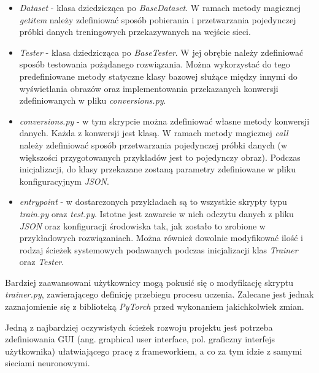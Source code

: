   \begin{itemize}
  \item \textit{Dataset} - klasa dziedzicząca po \textit{BaseDataset}. W ramach
  metody magicznej \textit{getitem} należy zdefiniować sposób pobierania i przetwarzania
  pojedynczej próbki danych treningowych przekazywanych na wejście sieci.

  \item \textit{Tester} - klasa dziedzicząca po \textit{BaseTester}. W jej obrębie
  należy zdefiniować sposób testowania pożądanego rozwiązania. Można wykorzystać
  do tego predefiniowane metody statyczne klasy bazowej służące między innymi
  do wyświetlania obrazów oraz implementowania przekazanych konwersji zdefiniowanych
  w pliku \textit{conversions.py}.

  \item \textit{conversions.py} - w tym skrypcie można zdefiniować własne metody
  konwersji danych. Każda z konwersji jest klasą. W ramach metody magicznej \textit{call}
  należy zdefiniować sposób przetwarzania pojedynczej próbki danych (w większości
  przygotowanych przykładów jest to pojedynczy obraz). Podczas inicjalizacji,
  do klasy przekazane zostaną parametry zdefiniowane w pliku konfiguracyjnym
  \textit{JSON}.

  \item \textit{entrypoint} - w dostarczonych przykładach są to wszystkie
  skrypty typu \textit{train.py} oraz \textit{test.py}. Istotne jest
  zawarcie w nich odczytu danych z pliku \textit{JSON} oraz konfiguracji środowiska tak,
  jak zostało to zrobione w przykładowych rozwiązaniach. Można również dowolnie
  modyfikować ilość i rodzaj ścieżek systemowych podawanych podczas inicjalizacji
  klas \textit{Trainer} oraz \textit{Tester}.
  \end{itemize}

  Bardziej zaawansowani użytkownicy mogą pokusić się o modyfikację skryptu
  \textit{trainer.py}, zawierającego definicję przebiegu procesu uczenia.
  Zalecane jest jednak zaznajomienie się z biblioteką \textit{PyTorch} przed wykonaniem
  jakichkolwiek zmian.

  Jedną z najbardziej oczywistych ścieżek rozwoju projektu jest
  potrzeba zdefiniowania GUI (ang. graphical user interface, pol. graficzny interfejs użytkownika) ułatwiającego pracę z frameworkiem, a co
  za tym idzie z samymi sieciami neuronowymi.
